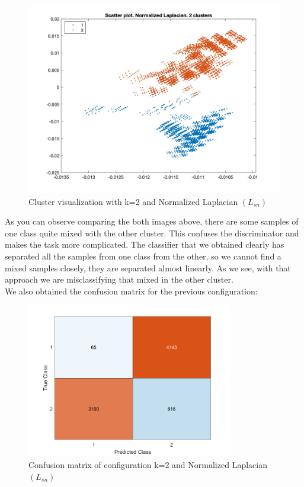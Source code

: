 \documentclass[12pt]{article}
\begin{document}
\begin{figure}[H]
	\centering
	\includegraphics[width=12cm]{2.jpg}
	\caption{Cluster visualization with k=2 and Normalized Laplacian $(L_{sn})$}
	\label{fig:normLapl2clusters}
\end{figure}

\smallskip
\justifying
As you can observe comparing the both images above, there are some samples of one class quite mixed with the other cluster. This confuses the discriminator and makes the task more complicated. The classifier that we obtained clearly has separated all the samples from one class from the other, so we cannot find a mixed samples closely, they are separated almost linearly. As we see, with that approach we are misclassifying that mixed in the other cluster.\\

We also obtained the confusion matrix for the previous configuration:

\begin{figure}[H]
	\centering
	\includegraphics[width=9cm]{confusionk2.png}
	\caption{Confusion matrix of configuration k=2 and Normalized Laplacian $(L_{sn})$}
	\label{fig:confusionk2NormLaplacian}
\end{figure}
\end{document}
